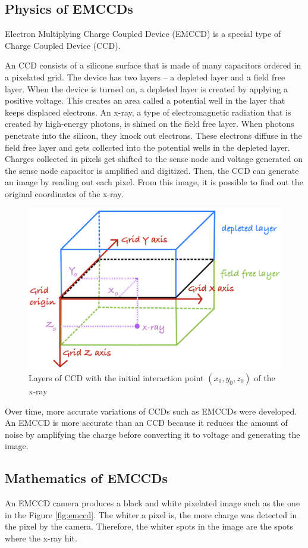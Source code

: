 \documentclass{article}
\begin{document}
\subsection{Physics of EMCCDs}

Electron Multiplying Charge Coupled Device (EMCCD) is a special type of Charge Coupled Device (CCD). 

An CCD consists of a silicone surface that is made of many capacitors ordered in a pixelated grid. The device has two layers – a depleted layer and a field free layer. When the device is turned on, a depleted layer is created by applying a positive voltage. This creates an area called a potential well in the layer that keeps displaced electrons. An x-ray, a type of electromagnetic radiation that is created by high-energy photons, is shined on the field free layer. When photons penetrate into the silicon, they knock out electrons. These electrons diffuse in the field free layer and gets collected into the potential wells in the depleted layer. 
Charges collected in pixels get shifted to the sense node and voltage generated on the sense node capacitor is amplified and digitized.  
Then, the CCD can generate an image by reading out each pixel. 
From this image, it is possible to find out the original coordinates of the x-ray.

\begin{figure}[H]
    \centering
    \includegraphics[width=0.7\linewidth]{images/layers.png}
    \caption{Layers of CCD with the initial interaction point $(x_0, y_0, z_0)$ of the x-ray}
    \label{fig:layers}
\end{figure}

Over time, more accurate variations of CCDs such as EMCCDs were developed. An EMCCD is more accurate than an CCD because it reduces the amount of noise by amplifying the charge before converting it to voltage and generating the image.


\subsection{Mathematics of EMCCDs}
An EMCCD camera produces a black and white pixelated image such as the one in the Figure \ref{fig:emccd}. The whiter a pixel is, the more charge was detected in the pixel by the camera. Therefore, the whiter spots in the image are the spots where the x-ray hit.
\end{document}
